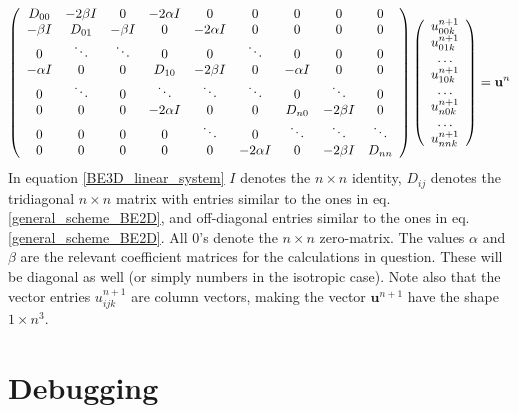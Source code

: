 \begin{align}\label{BE3D_linear_system}
  \left(\begin{array}{c c c c c c c c c}
        D_{00} & -2\beta I &0 &-2\alpha I &0 &0 &0 &0 &0\\
        -\beta I & D_{01} & -\beta I &0 &-2\alpha I &0 &0 &0 &0\\
        0&\ddots & \ddots & 0 & 0 & \ddots &0&0&0\\
        -\alpha I& 0&0 & D_{10} & -2\beta I& 0 & -\alpha I &0&0\\
        0& \ddots&0&\ddots & \ddots & \ddots & 0 & \ddots &0\\
        0& 0 &0 &-2\alpha I &0&0 & D_{n0} & -2\beta I&0\\
        0& 0 &0 &0 &\ddots&0&\ddots & \ddots &\ddots\\
         0&0 &0 &0&0 &-2\alpha I&0&-2\beta I & D_{nn}
       \end{array}\right)
       \left(\begin{array}{c}
             u^{n+1}_{00k}\\
             u^{n+1}_{01k}\\
             \dots\\
             u^{n+1}_{10k}\\
             \dots\\
             u^{n+1}_{n0k}\\
             \dots\\
             u^{n+1}_{nnk}
             \end{array}\right) = \mathbf{u}^{n}
\end{align}
In equation \ref{BE3D_linear_system} $I$ denotes the $n\times n$ identity, $D_{ij}$ denotes the tridiagonal $n\times n$ matrix with entries similar to the ones in eq. \ref{general_scheme_BE2D}, and off-diagonal entries similar to the ones in eq. \ref{general_scheme_BE2D}. 
All $0$'s denote the $n\times n$ zero-matrix. The values $\alpha$ and $\beta$ are the relevant coefficient matrices for the calculations in question. These will be diagonal as well (or simply numbers in the isotropic case). 
Note also that the vector entries $u^{n+1}_{ijk}$ are column vectors, making the vector $\mathbf{u}^{n+1}$ have the shape $1\times n^3$.





\section{Debugging}\label{debugging}

